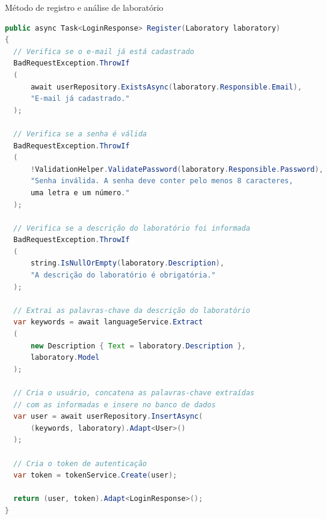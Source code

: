 \begin{sourcecode}[H]
  \caption{\label{codigo:analyze-lab}Método de registro e análise de laboratório}
  \begin{lstlisting}[frame=single, language=Java]
public async Task<LoginResponse> Register(Laboratory laboratory)
{
  // Verifica se o e-mail já está cadastrado
  BadRequestException.ThrowIf 
  (
      await userRepository.ExistsAsync(laboratory.Responsible.Email), 
      "E-mail já cadastrado."
  );

  // Verifica se a senha é válida
  BadRequestException.ThrowIf
  (
      !ValidationHelper.ValidatePassword(laboratory.Responsible.Password), 
      "Senha inválida. A senha deve conter pelo menos 8 caracteres, 
      uma letra e um número."
  );

  // Verifica se a descrição do laboratório foi informada
  BadRequestException.ThrowIf
  (
      string.IsNullOrEmpty(laboratory.Description), 
      "A descrição do laboratório é obrigatória."
  );

  // Extrai as palavras-chave da descrição do laboratório
  var keywords = await languageService.Extract
  (
      new Description { Text = laboratory.Description },
      laboratory.Model
  );

  // Cria o usuário, concatena as palavras-chave extraídas 
  // com as informadas e insere no banco de dados
  var user = await userRepository.InsertAsync(
      (keywords, laboratory).Adapt<User>()
  );

  // Cria o token de autenticação
  var token = tokenService.Create(user);

  return (user, token).Adapt<LoginResponse>();
}
\end{lstlisting}
  \fonte{}
\end{sourcecode}